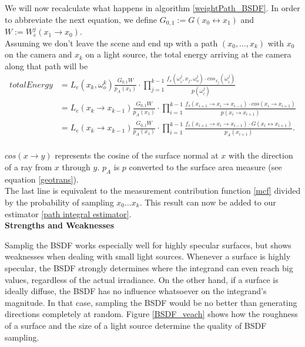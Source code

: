 We will now recalculate what happens in algorithm \ref{weightPath_BSDF}. In order to abbreviate the next equation, we define
$G_{0,1} := G(x_0 \leftrightarrow x_1)$ and $W:=W_e^j(x_1 \rightarrow x_0)$.\\
Assuming we don't leave the scene and end up with a path $(x_0, \dots, x_k)$ with $x_0$ on the camera and $x_k$ on a light source, the total energy arriving at the camera along that path will be 
\begin{equation}
\begin{split}
totalEnergy &= L_e(x_k,\omega_o^k) \frac{G_{0,1} W}{p_A(x_1)} \cdot \prod_{j = 1} ^{k-1} \frac{f_s(\omega_i^j,x_j,\omega_o^j) \cdot cos_{x_j}(\omega_i^j)}{p(\omega_i^j)}\\
&=  L_e(x_k \rightarrow x_{k-1})  \frac{G_{0,1} W}{p_A(x_1)} \cdot \prod_{i=1}^{k-1} \frac{f_s(x_{i+1} \rightarrow x_i \rightarrow x_{i-1}) \cdot cos(x_i \rightarrow x_{i+1})}{p(x_i \rightarrow x_{i+1})}\\
&= L_e(x_k \rightarrow x_{k-1})  \frac{G_{0,1} W}{p_A(x_1)} \cdot \prod_{i=1}^{k-1} \frac{f_s(x_{i+1} \rightarrow x_i \rightarrow x_{i-1}) \cdot G(x_i \leftrightarrow x_{i+1})}{p_A(x_{i+1})}.\\
\end{split}
\end{equation}

$cos(x \rightarrow y)$ represents the cosine of the surface normal at $x$ with the direction of a ray from $x$ through $y$. $p_A$ is $p$ converted to the surface area measure (see equation \ref{geotrans}).\\
The last line is equivalent to the measurement contribution function \ref{mcf} divided by the probability of sampling $x_0\dots x_k$. This result can now be added to our estimator \ref{path integral estimator}.\\

\textbf{Strengths and Weaknesses}

Samplig the BSDF works especially well for highly specular surfaces, but shows weaknesses when dealing with small light sources.\newline
Whenever a surface is highly specular, the BSDF strongly determines where the integrand can even reach big values, regardless of the actual irradiance. On the other hand, if a surface is ideally diffuse, the BSDF has no influence whatsoever on the integrand's magnitude. In that case, sampling the BSDF would be no better than generating directions completely at random. Figure \ref{BSDF_veach} shows how the roughness of a surface and the size of a light source determine the quality of BSDF sampling.


